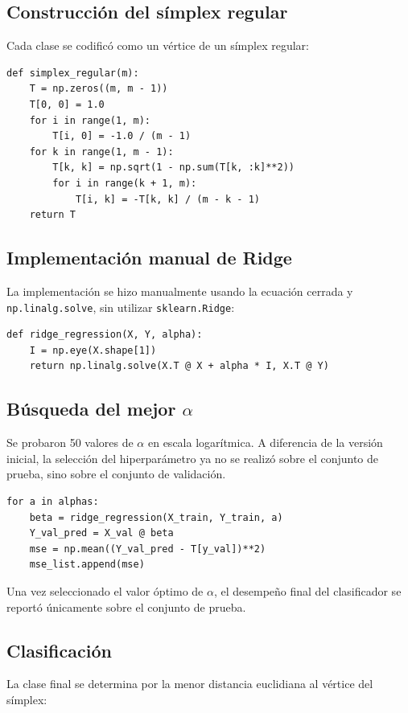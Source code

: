 \documentclass[12pt,a4paper]{article}
\begin{document}
\subsection{Construcción del símplex regular}
Cada clase se codificó como un vértice de un símplex regular:

\begin{lstlisting}
def simplex_regular(m):
    T = np.zeros((m, m - 1))
    T[0, 0] = 1.0
    for i in range(1, m):
        T[i, 0] = -1.0 / (m - 1)
    for k in range(1, m - 1):
        T[k, k] = np.sqrt(1 - np.sum(T[k, :k]**2))
        for i in range(k + 1, m):
            T[i, k] = -T[k, k] / (m - k - 1)
    return T
\end{lstlisting}

\subsection{Implementación manual de Ridge}
La implementación se hizo manualmente usando la ecuación cerrada y \texttt{np.linalg.solve}, sin utilizar \texttt{sklearn.Ridge}:

\begin{lstlisting}
def ridge_regression(X, Y, alpha):
    I = np.eye(X.shape[1])
    return np.linalg.solve(X.T @ X + alpha * I, X.T @ Y)
\end{lstlisting}

\subsection{Búsqueda del mejor $\alpha$}
Se probaron 50 valores de $\alpha$ en escala logarítmica. A diferencia de la versión inicial, la selección del hiperparámetro ya no se realizó sobre el conjunto de prueba, sino sobre el conjunto de validación.

\begin{lstlisting}
for a in alphas:
    beta = ridge_regression(X_train, Y_train, a)
    Y_val_pred = X_val @ beta
    mse = np.mean((Y_val_pred - T[y_val])**2)
    mse_list.append(mse)
\end{lstlisting}

Una vez seleccionado el valor óptimo de $\alpha$, el desempeño final del clasificador se reportó únicamente sobre el conjunto de prueba.

\subsection{Clasificación}
La clase final se determina por la menor distancia euclidiana al vértice del símplex:
\end{document}
